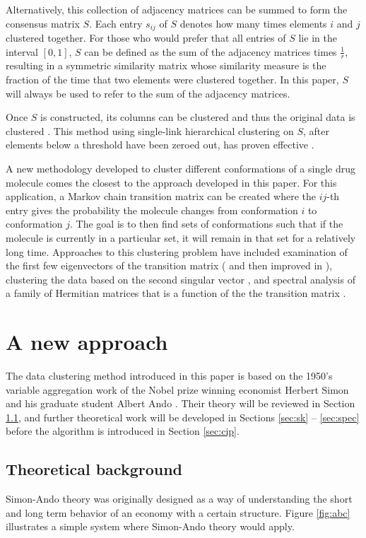 \documentclass[final]{siamltex}
\begin{document}
Alternatively, this collection of adjacency matrices can be summed to form the consensus matrix $S$. Each entry $s_{ij}$ of $S$ denotes how many times elements $i$ and $j$ clustered together. For those who would prefer that all entries of $S$ lie in the interval $[0,1]$, $S$ can be defined as the sum of the adjacency matrices times $\frac{1}{r}$, resulting in a symmetric similarity matrix whose similarity measure is the fraction of the time that two elements were clustered together. In this paper, $S$ will always be used to refer to the sum of the adjacency matrices.

Once $S$ is constructed, its columns can be clustered and thus the original data is clustered \cite{race}. This method using single-link hierarchical clustering on $S$, after elements below a threshold have been zeroed out, has proven effective \cite{fredjain2002}.

A new methodology developed to cluster different conformations of a single drug molecule comes the closest to the approach developed in this paper. For this application, a Markov chain transition matrix can be created where the $ij$-th entry gives the probability the molecule changes from conformation $i$ to conformation $j$. The goal is to then find sets of conformations such that if the molecule is currently in a particular set, it will remain in that set for a relatively long time. Approaches to this clustering problem have included examination of the first few eigenvectors of the transition matrix (\cite{deuflhard2000iai} and then improved in \cite{deuflhard2005rbc}), clustering the data based on the second singular vector \cite{fritzsche2008sai,tifenbach2011sba}, and spectral analysis of a family of Hermitian matrices that is a function of the the transition matrix \cite{jacobi2010rsm}.  

\section{A new approach}
The data clustering method introduced in this paper is based on the 1950's variable aggregation work of the Nobel prize winning economist Herbert Simon and his graduate student Albert Ando \cite{simonando}. Their theory will be reviewed in Section \ref{sec:tb}, and further theoretical work will be developed in Sections \ref{sec:sk} -- \ref{sec:spec} before the algorithm is introduced in Section \ref{sec:cip}.

\subsection{Theoretical background} \label{sec:tb}
Simon-Ando theory was originally designed as a way of understanding the short and long term behavior of an economy with a certain structure. Figure \ref{fig:abc} illustrates a simple system where Simon-Ando theory would apply. 
\end{document}
